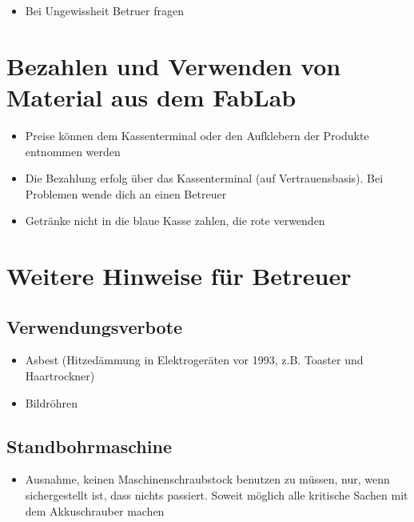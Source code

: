 \documentclass[13pt]{\basedir/fablab-document}
\begin{document}
\begin{itemize}
	\item Bei Ungewissheit Betruer fragen
\end{itemize}

\vbox{\vspace{0,5cm}}

\section{Bezahlen und Verwenden von Material aus dem FabLab}
\begin{itemize}
	\item Preise können dem Kassenterminal oder den Aufklebern der Produkte entnommen werden
	\item Die Bezahlung erfolg über das Kassenterminal (auf Vertrauensbasis). Bei Problemen wende dich an einen Betreuer
	\item Getränke nicht in die blaue Kasse zahlen, die rote verwenden
	
\end{itemize}


\newpage
\section{Weitere Hinweise für Betreuer}
\subsection{Verwendungsverbote}
\begin{itemize}
	\item Asbest (Hitzedämmung in Elektrogeräten vor 1993, z.B. Toaster und Haartrockner)
	\item Bildröhren
\end{itemize}

\subsection{Standbohrmaschine}
\begin{itemize}
	\item Ausnahme, keinen Maschinenschraubstock benutzen zu müssen, nur, wenn sichergestellt ist, dass nichts passiert. Soweit möglich alle kritische Sachen mit dem Akkuschrauber machen
\end{itemize}

\end{document}
